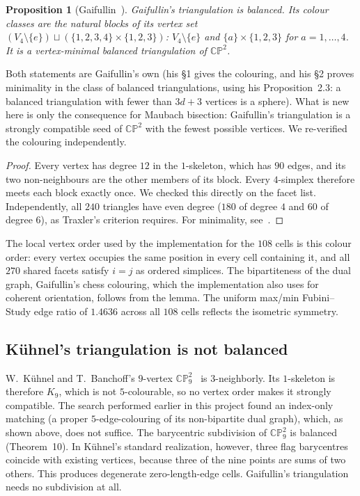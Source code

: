 \documentclass[11pt]{article}
\newtheorem*{propthm}{Proposition}
\newcommand{\CP}{\mathbb{CP}}
\begin{document}
\begin{propthm}[Gaifullin~\cite{gaifullin}]
Gaifullin's triangulation is balanced. Its colour classes are the natural
blocks of its vertex set $(V_4\setminus\{e\})\sqcup(\{1,2,3,4\}\times\{1,2,3\})$:
$V_4\setminus\{e\}$ and $\{a\}\times\{1,2,3\}$ for $a=1,\dots,4$.
It is a \emph{vertex-minimal balanced} triangulation of $\CP^2$.
\end{propthm}

Both statements are Gaifullin's own (his \S1 gives the colouring, and his
\S2 proves minimality in the class of balanced triangulations, using his
Proposition~2.3: a balanced triangulation with fewer than $3d+3$ vertices
is a sphere). What is new here is only the consequence for Maubach
bisection: Gaifullin's triangulation is a strongly compatible seed of
$\CP^2$ with the fewest possible vertices. We re-verified the colouring
independently.

\begin{proof}
Every vertex has degree $12$ in the $1$-skeleton, which has $90$ edges,
and its two non-neighbours are the other members of its block. Every
$4$-simplex therefore meets each block exactly once. We checked this
directly on the facet list. Independently, all $240$ triangles have even
degree ($180$ of degree $4$ and $60$ of degree $6$), as Traxler's
criterion requires. For minimality, see~\cite[\S2]{gaifullin}.
\end{proof}

The local vertex order used by the implementation for the $108$ cells
is this colour order: every vertex occupies the same position in every
cell containing it, and all $270$ shared facets satisfy $i=j$ as ordered
simplices. The bipartiteness of the dual graph, Gaifullin's chess
colouring, which the implementation also uses for coherent orientation,
follows from the lemma. The uniform max/min Fubini--Study edge ratio of
$1.4636$ across all $108$ cells reflects the isometric symmetry.

\subsection{Kühnel's triangulation is not balanced}
\label{sec:kuhnel}

W.~Kühnel and T.~Banchoff's $9$-vertex $\CP^2_9$~\cite{schwartz} is
$3$-neighborly. Its $1$-skeleton is therefore $K_9$, which is not
$5$-colourable, so no vertex order makes it strongly compatible. The
search performed earlier in this project found an index-only matching
(a proper $5$-edge-colouring of its non-bipartite dual graph), which, as
shown above, does not suffice. The barycentric subdivision of $\CP^2_9$
is balanced (Theorem~10). In Kühnel's standard realization, however,
three flag barycentres coincide with existing vertices, because three of
the nine points are sums of two others. This produces degenerate
zero-length-edge cells. Gaifullin's triangulation needs no subdivision
at all.
\end{document}
